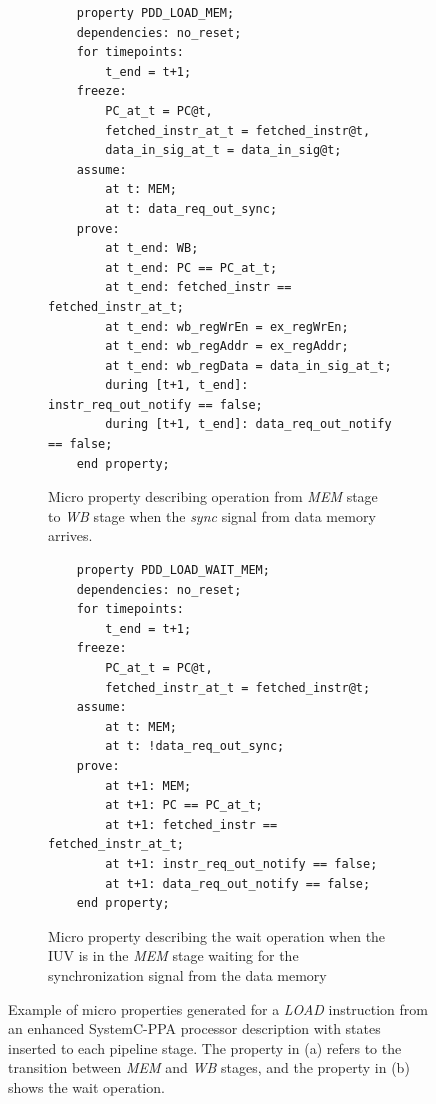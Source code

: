 \begin{figure}[htb!]
     \centering
     \begin{subfigure}[b]{\textwidth}
         \begin{lstlisting}
    property PDD_LOAD_MEM;
    dependencies: no_reset;
    for timepoints:
        t_end = t+1;
    freeze:
        PC_at_t = PC@t,
        fetched_instr_at_t = fetched_instr@t,
        data_in_sig_at_t = data_in_sig@t;
    assume:
        at t: MEM;
        at t: data_req_out_sync;
    prove:
        at t_end: WB;
        at t_end: PC == PC_at_t;
        at t_end: fetched_instr == fetched_instr_at_t;
        at t_end: wb_regWrEn = ex_regWrEn;
        at t_end: wb_regAddr = ex_regAddr;
        at t_end: wb_regData = data_in_sig_at_t;
        during [t+1, t_end]: instr_req_out_notify == false;
        during [t+1, t_end]: data_req_out_notify == false;
    end property;\end{lstlisting}
         \caption{Micro property describing operation from \textit{MEM} stage to \textit{WB} stage when the \textit{sync} signal from data memory arrives.}
         \label{subfig:load-mem-micro-ppt}
     \end{subfigure}
     \hfill
     \begin{subfigure}[b]{\textwidth}
         \begin{lstlisting}
    property PDD_LOAD_WAIT_MEM;
    dependencies: no_reset;
    for timepoints:
        t_end = t+1;
    freeze:
        PC_at_t = PC@t,
        fetched_instr_at_t = fetched_instr@t;
    assume:
        at t: MEM;
        at t: !data_req_out_sync;
    prove:
        at t+1: MEM;
        at t+1: PC == PC_at_t;
        at t+1: fetched_instr == fetched_instr_at_t;
        at t+1: instr_req_out_notify == false;
        at t+1: data_req_out_notify == false;
    end property;\end{lstlisting}
         \caption{Micro property describing the wait operation when the IUV is in the \textit{MEM} stage waiting for the synchronization signal from the data memory}
         \label{subfig:load-wait-micro-ppt}
     \end{subfigure}
        \caption{Example of micro properties generated for a \textit{LOAD} instruction from an enhanced SystemC-PPA processor description with states inserted to each pipeline stage. The property in (a) refers to the transition between \textit{MEM} and \textit{WB} stages, and the property in (b) shows the wait operation.}
        \label{fig:load-mem-wait-micro-ppt}
\end{figure}


